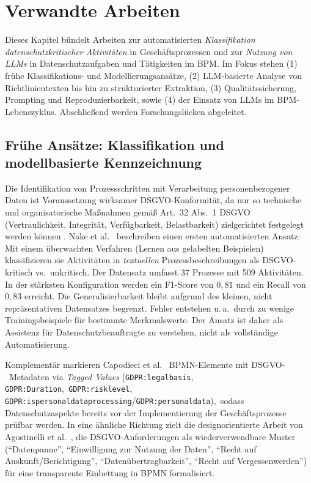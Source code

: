 \section{Verwandte Arbeiten}\label{sec:verwandte-arbeiten}

Dieses Kapitel bündelt Arbeiten zur automatisierten \emph{Klassifikation datenschutzkritischer Aktivitäten} in Geschäftsprozessen und zur \emph{Nutzung von \acp{LLM}} in Datenschutzaufgaben und Tätigkeiten im \ac{BPM}. Im Fokus stehen (1) frühe Klassifikations- und Modellierungsansätze, (2) \ac{LLM}-basierte Analyse von Richtlinientexten bis hin zu strukturierter Extraktion, (3) Qualitätssicherung, Prompting und Reproduzierbarkeit, sowie (4) der Einsatz von \acp{LLM} im \ac{BPM}-Lebenszyklus. Abschließend werden Forschungslücken abgeleitet.

\subsection*{Frühe Ansätze: Klassifikation und modellbasierte Kennzeichnung}

Die Identifikation von Prozessschritten mit Verarbeitung personenbezogener Daten ist Voraussetzung wirksamer \ac{DSGVO}-Konformität, da nur so technische und organisatorische Maßnahmen gemäß Art.~32 Abs.~1 \ac{DSGVO} (Vertraulichkeit, Integrität, Verfügbarkeit, Belastbarkeit) zielgerichtet festgelegt werden können \cite{GDPR2016}. Nake et al.\ \cite{nake2023towards} beschreiben einen ersten automatisierten Ansatz: Mit einem überwachten Verfahren (Lernen aus gelabelten Beispielen) klassifizieren sie Aktivitäten in \emph{textuellen} Prozessbeschreibungen als \ac{DSGVO}-kritisch vs.\ unkritisch. Der Datensatz umfasst 37 Prozesse mit 509 Aktivitäten. In der stärksten Konfiguration werden ein F1-Score von $0{,}81$ und ein Recall von $0{,}83$ erreicht. Die Generalisierbarkeit bleibt aufgrund des kleinen, nicht repräsentativen Datensatzes begrenzt. Fehler entstehen u.\,a.\ durch zu wenige Trainingsbeispiele für bestimmte Merkmalswerte. Der Ansatz ist daher als Assistenz für Datenschutzbeauftragte zu verstehen, nicht als vollständige Automatisierung.

Komplementär markieren Capodieci et al.\ \cite{Capodieci2023BPMNEnabledDP} \ac{BPMN}-Elemente mit \ac{DSGVO}-\linebreak~Metadaten via \emph{Tagged Values} (\texttt{GDPR:legalbasis}, \texttt{GDPR:Duration},\linebreak~\texttt{GDPR:risklevel}, \texttt{GDPR:ispersonaldataprocessing}/\texttt{GDPR:personaldata}),\linebreak~sodass Datenschutzaspekte bereits vor der Implementierung der Geschäftsprozesse prüfbar werden. In eine ähnliche Richtung zielt die designorientierte Arbeit von Agostinelli et al.\ \cite{agostinelli2019achievingGDPRComliance}, die \ac{DSGVO}-Anforderungen als wiederverwendbare Muster (\enquote{Datenpanne}, \enquote{Einwilligung zur Nutzung der Daten}, \enquote{Recht auf Auskunft/Berichtigung}, \enquote{Datenübertragbarkeit}, \enquote{Recht auf Vergessenwerden})
 für eine transparente Einbettung in \ac{BPMN} formalisiert.

